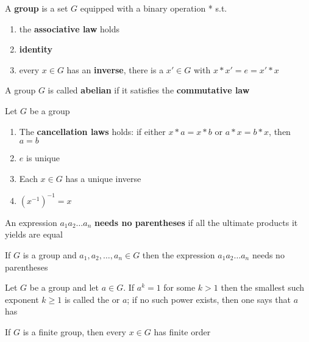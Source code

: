 \documentclass[11pt]{article}
\begin{document}
\begin{definition}[]
A \textbf{group} is a set \(G\) equipped with a binary operation * s.t.
\begin{enumerate}
\item the \textbf{associative law} holds
\item \textbf{identity}
\item every \(x\in G\) has an \textbf{inverse}, there is a \(x'\in G\)  with 
\(x*x'=e=x'*x\)
\end{enumerate}
\end{definition}

\begin{definition}[]
A group \(G\) is called \textbf{abelian} if it satisfies the
\textbf{commutative law}
\end{definition}

\begin{lemma}[]
Let \(G\) be a group
\begin{enumerate}
\item The \textbf{cancellation laws} holds: if either \(x*a=x*b\) or \(a*x=b*x\), then
\(a=b\)
\item \(e\) is unique
\item Each \(x\in G\) has a unique inverse
\item \((x^{-1})^{-1}=x\)
\end{enumerate}
\end{lemma}

\begin{definition}[]
An expression \(a_1a_2\dots a_n\) \textbf{needs no parentheses} if all the ultimate
products it yields are equal
\end{definition}

\begin{theorem}
If \(G\) is a group and \(a_1,a_2,\dots,a_n\in G\) then the expression
\(a_1a_2\dots a_n\) needs no parentheses
\end{theorem}

\begin{definition}[]
Let \(G\) be a group and let \(a\in G\). If \(a^k=1\) for some \(k>1\) then the
smallest such exponent \(k\ge 1\) is called the  or \(a\); if no such
power exists, then one says that \(a\) has 
\end{definition}

\begin{proposition}[]
If \(G\) is a finite group, then every \(x\in G\) has finite order
\end{proposition}
\end{document}
